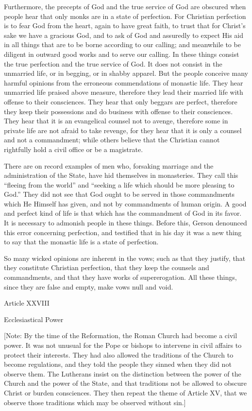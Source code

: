 Furthermore, the precepts of God and the true service of God are obscured when people hear that only monks are in a state of perfection. For Christian perfection is to fear God from the heart, again to have great faith, to trust that for Christ’s sake we have a gracious God, and to ask of God and assuredly to expect His aid in all things that are to be borne according to our calling; and meanwhile to be diligent in outward good works and to serve our calling. In these things consist the true perfection and the true service of God. It does not consist in the unmarried life, or in begging, or in shabby apparel. But the people conceive many harmful opinions from the erroneous commendations of monastic life. They hear unmarried life praised above measure, therefore they lead their married life with offense to their consciences. They hear that only beggars are perfect, therefore they keep their possessions and do business with offense to their consciences. They hear that it is an evangelical counsel not to avenge, therefore some in private life are not afraid to take revenge, for they hear that it is only a counsel and not a commandment; while others believe that the Christian cannot rightfully hold a civil office or be a magistrate.

There are on record examples of men who, forsaking marriage and the administration of the State, have hid themselves in monasteries. They call this “fleeing from the world” and “seeking a life which should be more pleasing to God.” They did not see that God ought to be served in those commandments which He Himself has given, and not by commandments of human origin. A good and perfect kind of life is that which has the commandment of God in its favor. It is necessary to admonish people in these things. Before this, Gerson denounced this error concerning perfection, and testified that in his day it was a new thing to say that the monastic life is a state of perfection.

So many wicked opinions are inherent in the vows; such as that they justify, that they constitute Christian perfection, that they keep the counsels and commandments, and that they have works of supererogation. All these things, since they are false and empty, make vows null and void.

 

Article XXVIII

Ecclesiastical Power

[Note: By the time of the Reformation, the Roman Church had become a civil power. It was not unusual for the Pope or bishops to intervene in civil affairs to protect their interests. They had also allowed the traditions of the Church to become regulations, and they told the people they sinned when they did not observe them. The Lutherans insist on the distinction between the power of the Church and the power of the State, and that traditions not be allowed to obscure Christ or burden consciences. They then repeat the theme of Article XV, that we observe those traditions which may be observed without sin.]

